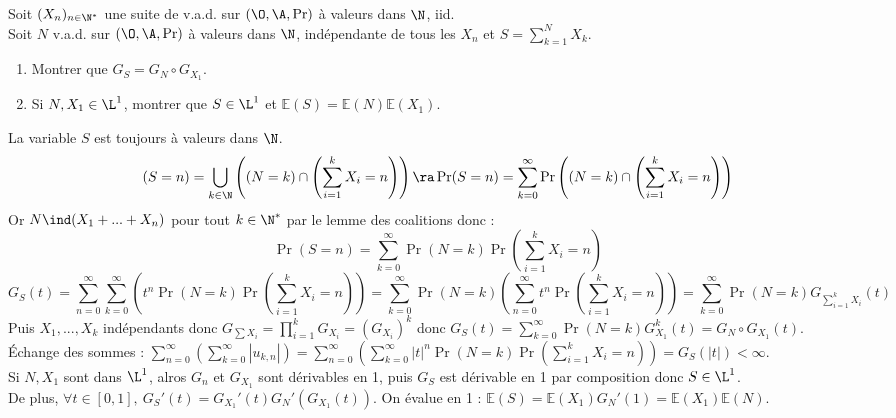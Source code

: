 \documentclass[11pt]{article}
\renewcommand*{\E}{\mathbb{E}}
\begin{document}
\vspace*{-0.8cm}

\begin{exercice}{}{}
    Soit $(X_n)_{n\in\N^*}$ une suite de v.a.d. sur $(\O,\A,\Pr)$ à valeurs dans $\N$, iid.\\
    Soit $N$ v.a.d. sur $(\O,\A,\Pr)$ à valeurs dans $\N$, indépendante de tous les $X_n$ et $S=\sum_{k=1}^N X_k$.
    \begin{enumerate}
        \item Montrer que $G_S = G_N \circ G_{X_1}$.
        \item Si $N,X_1\in\L^1$, montrer que $S\in\L^1$ et $\E(S)=\E(N)\E(X_1)$.
    \end{enumerate}
    \tcblower
    \footnotesize
     La variable $S$ est toujours à valeurs dans $\N$.
    \begin{equation*}
        (S=n) = \bigcup_{k\in\N}\left(\left(N=k\right)\cap \left(\sum_{i=1}^k X_i = n\right)\right) \ra
        \Pr(S=n)=\sum_{k=0}^{\infty}\Pr\left((N=k)\cap\left( \sum_{i=1}^k X_i = n \right)\right)
    \end{equation*}
    Or $N\ind (X_1+...+X_n)$ pour tout $k\in\N^*$ par le lemme des coalitions donc :
    \begin{equation*}
        \Pr(S=n) = \sum_{k=0}^\infty \Pr(N=k)\Pr\left( \sum_{i=1}^k X_i = n \right)
    \end{equation*}
    \begin{equation*}
        G_S(t) = \sum_{n=0}^\infty \sum_{k=0}^\infty \left( t^n \Pr(N=k)\Pr\left( \sum_{i=1}^k X_i = n \right) \right) = \sum_{k=0}^{\infty}\Pr(N=k)\left( \sum_{n=0}^{\infty}t^n\Pr\left(\sum_{i=1}^k X_i = n\right) \right) = \sum_{k=0}^\infty \Pr(N=k)G_{\sum_{i=1}^k X_i}(t)
    \end{equation*}
    Puis $X_1,...,X_k$ indépendants donc $G_{\sum X_i}=\prod_{i=1}^k G_{X_i}=(G_{X_i})^k$ donc $G_S(t)=\sum_{k=0}^\infty\Pr(N=k)G_{X_1}^k(t)=G_N\circ G_{X_1}(t)$.\\
    Échange des sommes : $\sum_{n=0}^\infty\left(\sum_{k=0}^\infty|u_{k,n}|\right)=\sum_{n=0}^\infty\left(\sum_{k=0}^\infty|t|^n\Pr(N=k)\Pr(\sum_{i=1}^k X_i = n)\right)=G_S(|t|)<\infty$.\\
     Si $N,X_1$ sont dans $\L^1$, alros $G_n$ et $G_{X_1}$ sont dérivables en 1, puis $G_S$ est dérivable en 1 par composition donc $S\in\L^1$.\\
    De plus, $\forall t \in [0,1], ~ G_S'(t)=G_{X_1}'(t)G_{N}'(G_{X_1}(t))$. On évalue en 1 : $\E(S)=\E(X_1)G_N'(1)=\E(X_1)\E(N)$.
\end{exercice}
\end{document}
